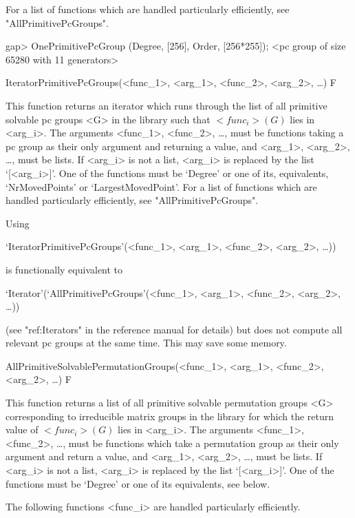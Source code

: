 For a list of functions which are handled particularly efficiently, see
"AllPrimitivePcGroups".

\beginexample
gap> OnePrimitivePcGroup (Degree, [256], Order, [256*255]);
<pc group of size 65280 with 11 generators>
\endexample

\>IteratorPrimitivePcGroups(<func_1>, <arg_1>, <func_2>, <arg_2>, \dots) F

This function returns an iterator which runs through the list of all primitive solvable
pc groups <G> in the  {\IRREDSOL} library such that
$<func_i>(G)$ lies in <arg_i>. The arguments <func_1>, <func_2>, \dots,
must be {\GAP} functions taking a pc group as their only argument and returning 
a value, and <arg_1>, <arg_2>, \dots, 
must be lists. If <arg_i> is not a list, <arg_i> is replaced by the list `[<arg_i>]'.
One of the functions must be `Degree' or one of its, equivalents, `NrMovedPoints' 
or `LargestMovedPoint'.
For a list of functions which are handled particularly efficiently, see
"AllPrimitivePcGroups".

Using 

`IteratorPrimitivePcGroups'(<func_1>, <arg_1>, <func_2>, <arg_2>, \dots)) 

is functionally equivalent to 

`Iterator'(`AllPrimitivePcGroups'(<func_1>, <arg_1>, <func_2>, <arg_2>, \dots))

(see "ref:Iterators" in the {\GAP} reference manual for details) but does not 
compute all relevant pc groups at the same time. 
This may save some memory. 




\>AllPrimitiveSolvablePermutationGroups(<func_1>, <arg_1>, <func_2>, <arg_2>, \dots) F

This function returns a list of all primitive solvable permutation
groups <G> corresponding to irreducible matrix groups in the  {\IRREDSOL} library 
for which the return value of $<func_i>(G)$ lies
in <arg_i>.  The arguments <func_1>, <func_2>, \dots,
must be {\GAP} functions which take a permutation group as their only argument and return a
value, and <arg_1>, <arg_2>,
\dots,  must be lists. If <arg_i> is not a list, <arg_i> is replaced by the list
`[<arg_i>]'. One of the functions must be `Degree' or one of its
equivalents, see below.

The following functions <func_i> are handled particularly efficiently. 

